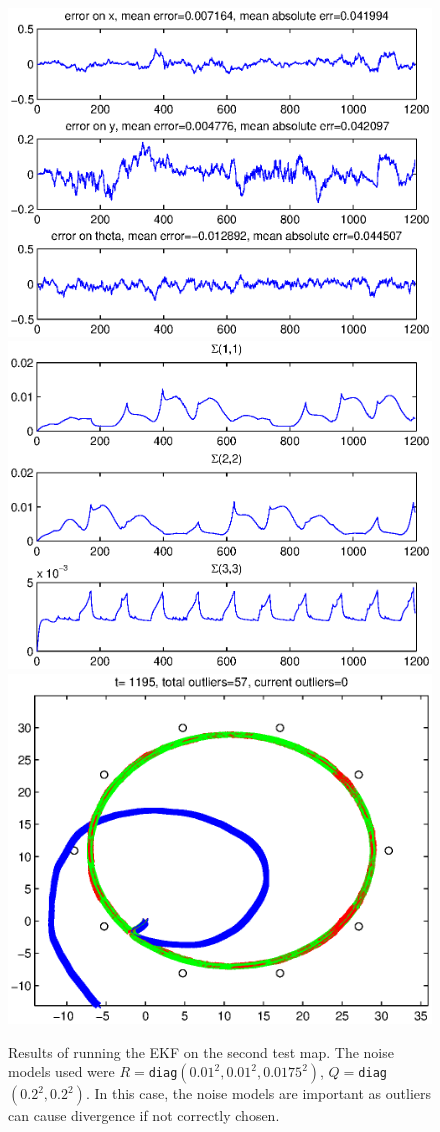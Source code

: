 \documentclass[a4paper,12pt]{article}
\begin{document}
\begin{figure}
  \centerline
  {
    \includegraphics[width=.43\textwidth]{figures/ekf/map2_seq_error}
    \includegraphics[width=.43\textwidth]{figures/ekf/map2_seq_sigma}
    \includegraphics[width=.43\textwidth]{figures/ekf/map2_seq_motion}
  }
  \caption{Results of running the EKF on the second test map. The noise models
    used were $R=$\texttt{diag}$(0.01^2, 0.01^2, 0.0175^2)$,
    $Q=$\texttt{diag}$(0.2^2, 0.2^2)$. In this case, the noise models are
    important as outliers can cause divergence if not correctly chosen.}
  \label{fig:map2}
\end{figure}
\end{document}
